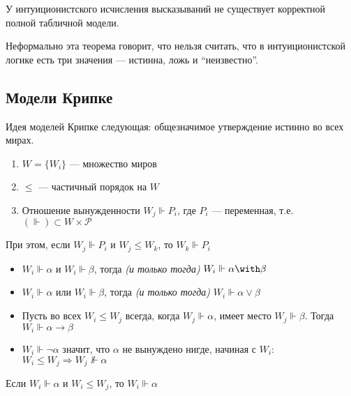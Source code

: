 \documentclass[12pt, a4paper, oneside]{book}
\begin{document}
\begin{theorem}
    У интуиционистского исчисления высказываний не существует корректной полной табличной модели.
\end{theorem}

Неформально эта теорема говорит, что нельзя считать, что в интуиционистской логике есть три значения --- истинна, ложь и ``неизвестно''.

\subsection{Модели Крипке}

Идея моделей Крипке следующая: общезначимое утверждение истинно во всех мирах.

\begin{definition}\itemfix
    \begin{enumerate}
        \item \(W = \{W_i\}\) --- множество миров
        \item \( \leq \) --- частичный порядок на \(W\)
        \item Отношение вынужденности \(W_j \Vdash P_i\), где \(P_i\) --- переменная, т.е. \((\Vdash) \subset W \times \mathcal{P}\)
    \end{enumerate}

    При этом, если \(W_j \Vdash P_i\) и \(W_j \leq W_k\), то \(W_k \Vdash P_i\)
\end{definition}

\begin{definition}\itemfix
    \begin{itemize}
        \item \(W_i \Vdash \alpha\) и \(W_i \Vdash \beta\), тогда \textit{(и только тогда)} \(W_i \Vdash \alpha \with \beta\)
        \item \(W_i \Vdash \alpha\) или \(W_i \Vdash \beta\), тогда \textit{(и только тогда)} \(W_i \Vdash \alpha \lor \beta\)
        \item Пусть во всех \(W_i \leq W_j\) всегда, когда \(W_j \Vdash \alpha\), имеет место \(W_j \Vdash \beta\). Тогда \(W_i \Vdash \alpha \to \beta\)
        \item \(W_i \Vdash \neg \alpha\) значит, что \(\alpha\) не вынуждено нигде, начиная с \(W_i\): \(W_i \leq W_j \Rightarrow W_j \nVdash \alpha\)
    \end{itemize}
\end{definition}

\begin{theorem}
    Если \(W_i \Vdash \alpha\) и \(W_i \leq W_j\), то \(W_i \Vdash \alpha\)
\end{theorem}
\end{document}
